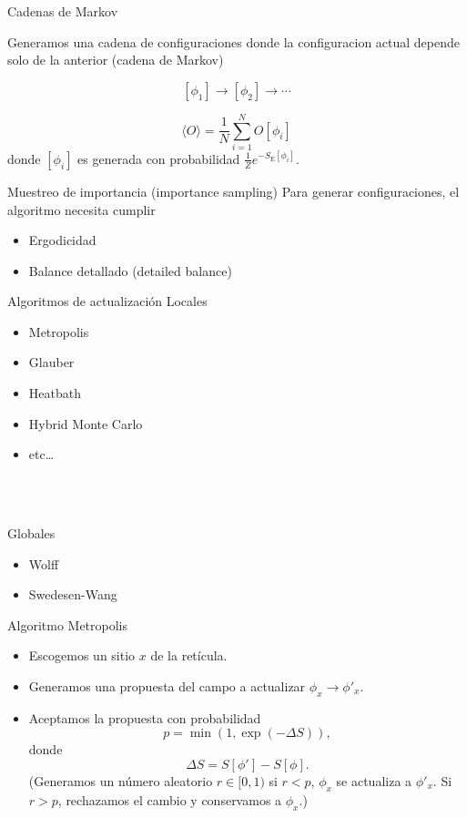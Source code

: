 \documentclass[11pt]{beamer}
\begin{document}
\begin{frame}{Cadenas de Markov}

    Generamos una cadena de configuraciones donde la configuracion actual depende solo de la anterior (cadena de Markov)
    
    $$ [\phi_1] \to [\phi_2] \to \cdots$$

    $$\langle O \rangle = \frac{1}{N}\sum_{i=1}^N O[\phi_i]$$
    donde $[\phi_i]$ es generada con probabilidad $\frac{1}{Z}e^{-S_{\text{E}}[\phi_i]}$.
\end{frame}

\begin{frame}{Muestreo de importancia (importance sampling)}
    Para generar configuraciones, el algoritmo necesita cumplir
    \begin{itemize}
        \item Ergodicidad
        \item Balance detallado (detailed balance)
    \end{itemize}
\end{frame}

\begin{frame}{Algoritmos de actualización}
    Locales
    \begin{itemize}
        \item Metropolis
        \item Glauber
        \item Heatbath
        \item Hybrid Monte Carlo
        \item etc\dots
    \end{itemize}
    
    \ \\~
    
    Globales
    \begin{itemize}
        \item Wolff
        \item Swedesen-Wang
    \end{itemize}
\end{frame}

\begin{frame}{Algoritmo Metropolis}
    \begin{itemize}
        \item Escogemos un sitio $x$ de la retícula.
        \item Generamos una propuesta del campo a actualizar $\phi_x \to \phi'_x$.
        \item Aceptamos la propuesta con probabilidad 
        $$ p = \min\left(1, \exp\left(-\Delta S\right)\right),$$
           donde
        $$ \Delta S = S[\phi'] - S[\phi].$$        
        (Generamos un número aleatorio $r\in[0,1)$ si $r<p$, $\phi_x$ se actualiza a $\phi'_x$. Si $r>p$, rechazamos el cambio y conservamos a $\phi_x$.)
      
    \end{itemize}
\end{frame}
\end{document}
